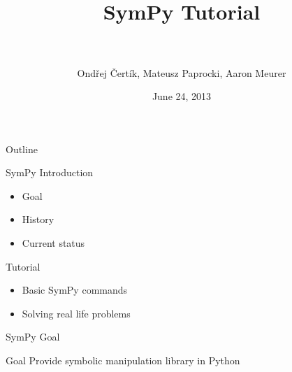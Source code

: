 \documentclass[xcolor=svgnames]{beamer}
\title[SymPy\hspace{4em}\insertframenumber/
\inserttotalframenumber]{~\\ SymPy Tutorial \\~}
\author[O. Čertík, M. Paprocki, A. Meurer]
{Ondřej Čertík, Mateusz Paprocki, Aaron Meurer}
\institute{\pgfuseimage{mylogo}}
\date{June 24, 2013}
\begin{document}
\begin{frame}
\maketitle
\end{frame}

\begin{frame}{Outline}
\begin{block}{SymPy Introduction}
\begin{itemize}
\item Goal
\item History
\item Current status
\end{itemize}
\end{block}

\begin{block}{Tutorial}
\begin{itemize}
\item Basic SymPy commands
\item Solving real life problems
\end{itemize}
\end{block}
\end{frame}

\begin{frame}{SymPy Goal}
\begin{block}{Goal}
Provide symbolic manipulation library in Python
\end{block}
\end{frame}
\end{document}
